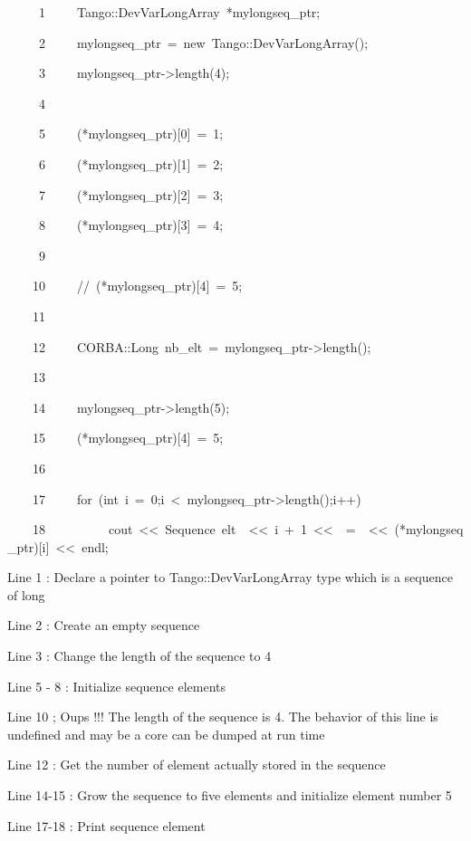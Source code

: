 
\begin{lyxcode}
~~~~~1~~~~~Tango::DevVarLongArray~{*}mylongseq\_ptr;

~~~~~2~~~~~mylongseq\_ptr~=~new~Tango::DevVarLongArray();

~~~~~3~~~~~mylongseq\_ptr->length(4);

~~~~~4~~

~~~~~5~~~~~({*}mylongseq\_ptr){[}0{]}~=~1;

~~~~~6~~~~~({*}mylongseq\_ptr){[}1{]}~=~2;

~~~~~7~~~~~({*}mylongseq\_ptr){[}2{]}~=~3;

~~~~~8~~~~~({*}mylongseq\_ptr){[}3{]}~=~4;

~~~~~9~~

~~~~10~~~~~//~({*}mylongseq\_ptr){[}4{]}~=~5;

~~~~11~~

~~~~12~~~~~CORBA::Long~nb\_elt~=~mylongseq\_ptr->length();

~~~~13~~

~~~~14~~~~~mylongseq\_ptr->length(5);

~~~~15~~~~~({*}mylongseq\_ptr){[}4{]}~=~5;

~~~~16~~

~~~~17~~~~~for~(int~i~=~0;i~<~mylongseq\_ptr->length();i++)

~~~~18~~~~~~~~~~cout~<\textcompwordmark{}<~\textquotedbl{}Sequence~elt~\textquotedbl{}~<\textcompwordmark{}<~i~+~1~<\textcompwordmark{}<~\textquotedbl{}~=~\textquotedbl{}~<\textcompwordmark{}<~({*}mylongseq\_ptr){[}i{]}~<\textcompwordmark{}<~endl;
\end{lyxcode}


Line 1 : Declare a pointer to Tango::DevVarLongArray type which is
a sequence of long

Line 2 : Create an empty sequence

Line 3 : Change the length of the sequence to 4

Line 5 - 8 : Initialize sequence elements

Line 10 ; Oups !!! The length of the sequence is 4. The behavior of
this line is undefined and may be a core can be dumped at run time

Line 12 : Get the number of element actually stored in the sequence

Line 14-15 : Grow the sequence to five elements and initialize element
number 5

Line 17-18 : Print sequence element

